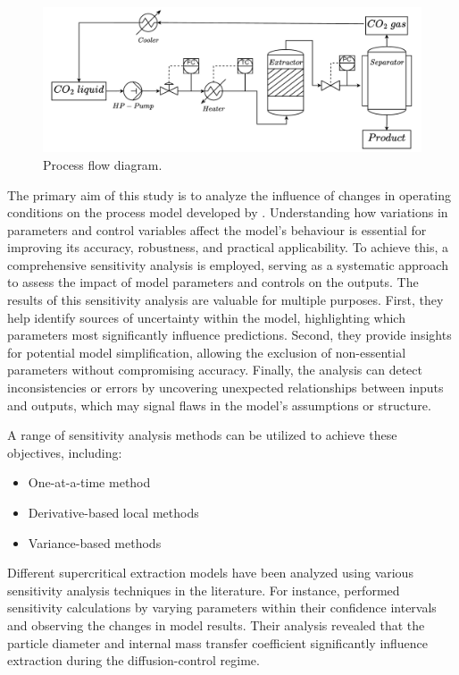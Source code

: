 \documentclass[a4paper,fleqn]{cas-dc}
\begin{document}
	\begin{figure}[h!]
		\centering
		\includegraphics[width=\columnwidth]{Figures/PFD.drawio.pdf}
		\caption{Process flow diagram.}
		\label{fig: SFE_drawing}
	\end{figure}
	
	The primary aim of this study is to analyze the influence of changes in operating conditions on the process model developed by \citet{Sliczniuk2024}. Understanding how variations in parameters and control variables affect the model's behaviour is essential for improving its accuracy, robustness, and practical applicability. To achieve this, a comprehensive sensitivity analysis is employed, serving as a systematic approach to assess the impact of model parameters and controls on the outputs. The results of this sensitivity analysis are valuable for multiple purposes. First, they help identify sources of uncertainty within the model, highlighting which parameters most significantly influence predictions. Second, they provide insights for potential model simplification, allowing the exclusion of non-essential parameters without compromising accuracy. Finally, the analysis can detect inconsistencies or errors by uncovering unexpected relationships between inputs and outputs, which may signal flaws in the model's assumptions or structure.
	
	A range of sensitivity analysis methods can be utilized to achieve these objectives, including:
	
	\begin{itemize}
		\item One-at-a-time method
		\item Derivative-based local methods
		\item Variance-based methods
	\end{itemize}
	
	Different supercritical extraction models have been analyzed using various sensitivity analysis techniques in the literature. For instance, \citet{Fiori2007} performed sensitivity calculations by varying parameters within their confidence intervals and observing the changes in model results. Their analysis revealed that the particle diameter and internal mass transfer coefficient significantly influence extraction during the diffusion-control regime.
	
\end{document}
